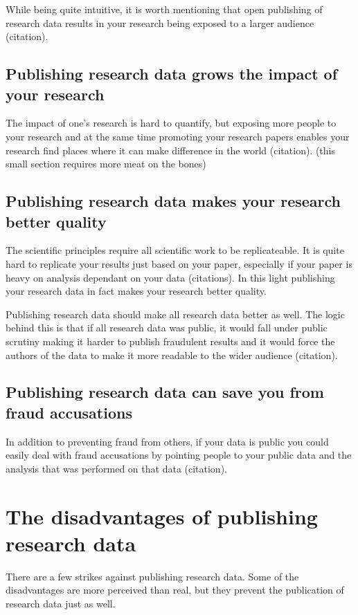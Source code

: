 While being quite intuitive, it is worth mentioning that open publishing of
research data results in your research being exposed to a larger audience
(citation).

\subsection{Publishing research data grows the impact of your research}

The impact of one's research is hard to quantify, but exposing more people to
your research and at the same time promoting your research papers enables your
research find places where it can make difference in the world (citation).
(this small section requires more meat on the bones)

\subsection{Publishing research data makes your research better quality}

The scientific principles require all scientific work to be replicateable. It
is quite hard to replicate your results just based on your paper, especially if
your paper is heavy on analysis dependant on your data (citations). In this
light publishing your research data in fact makes your research better quality.

Publishing research data should make all research data better as well. The
logic behind this is that if all research data was public, it would fall under
public scrutiny making it harder to publish fraudulent results and it would
force the authors of the data to make it more readable to the wider audience
(citation).

\subsection{Publishing research data can save you from fraud accusations}

In addition to preventing fraud from others, if your data is public you could
easily deal with fraud accusations by pointing people to your public data and
the analysis that was performed on that data (citation).

\section{The disadvantages of publishing research data}

There are a few strikes against publishing research data. Some of the
disadvantages are more perceived than real, but they prevent the publication
of research data just as well.

